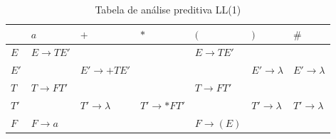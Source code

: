 \documentclass[
  brazilian,
  letterpaper,
]{book}
\theoremstyle{plain}
\theoremstyle{definition}
\theoremstyle{remark}
\begin{document}
\begin{longtable}[]{|
  >{\centering\arraybackslash}p{}|
  >{\centering\arraybackslash}p{}|
  >{\centering\arraybackslash}p{}|
  >{\centering\arraybackslash}p{}|
  >{\centering\arraybackslash}p{}|
  >{\centering\arraybackslash}p{}|
  >{\centering\arraybackslash}p{}|}

\caption{\label{tbl-tabela-ll1}Tabela de análise preditiva LL(1)}

\tabularnewline

\toprule\noalign{}
\begin{minipage}[b]{\linewidth}\smallskip
\centering
\end{minipage} & \begin{minipage}[b]{\linewidth}\centering
\(a\)
\end{minipage} & \begin{minipage}[b]{\linewidth}\centering
\(+\)
\end{minipage} & \begin{minipage}[b]{\linewidth}\centering
\(*\)
\end{minipage} & \begin{minipage}[b]{\linewidth}\centering
\((\)
\end{minipage} & \begin{minipage}[b]{\linewidth}\centering
\()\)
\end{minipage} & \begin{minipage}[b]{\linewidth}\centering
\(\#\)
\end{minipage} \\
\midrule\noalign{}
\endhead
\bottomrule\noalign{}
\endlastfoot
\(E\) & \(E \rightarrow TE'\) & & & \(E \rightarrow TE'\) & & \\
\midrule
\(E'\) & & \(E' \rightarrow +TE'\) & & & \(E' \rightarrow \lambda\) &
\(E' \rightarrow \lambda\) \\
\midrule
\(T\) & \(T \rightarrow FT'\) & & & \(T \rightarrow FT'\) & & \\
\midrule
\(T'\) & & \(T' \rightarrow \lambda\) & \(T' \rightarrow *FT'\) & &
\(T' \rightarrow \lambda\) & \(T' \rightarrow \lambda\) \\
\midrule
\(F\) & \(F \rightarrow a\) & & & \(F \rightarrow (E)\) & & \\

\end{longtable}
\end{document}
